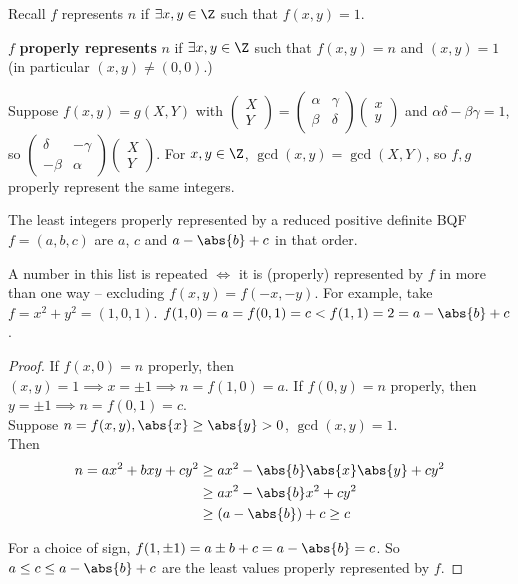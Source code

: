 \documentclass{article}
\begin{document}
Recall $f$ represents $n$ if $\exists x, y \in \Z$ such that $f(x,y) = 1$.
\begin{defi}
    $f$ \textbf{properly represents} $n$ if $\exists x, y \in \Z$ such that $f(x, y) = n$ and $(x, y) = 1$ (in particular $(x, y) \neq (0, 0)$.)
\end{defi}

\begin{remark}
    Suppose $f(x, y) = g(X, Y)$ with $\begin{pmatrix}X \\ Y\end{pmatrix} = \begin{pmatrix}\alpha & \gamma \\ \beta & \delta\end{pmatrix} \begin{pmatrix}x \\ y\end{pmatrix}$ and $\alpha\delta - \beta \gamma = 1$, so $\begin{pmatrix}\delta & -\gamma \\ -\beta &  \alpha \end{pmatrix} \begin{pmatrix}X \\ Y\end{pmatrix}$.
    For $x, y \in \Z$, $\gcd(x, y) = \gcd(X, Y)$, so $f, g$ properly represent the same integers.
\end{remark}

\begin{nlemma}\label{lem:4.7}
    The least integers properly represented by a reduced positive definite BQF $f = (a, b, c)$ are $a$, $c$ and $a - \abs{b} + c$ in that order.
\end{nlemma}
A number in this list is repeated $\iff$ it is (properly) represented by $f$ in more than one way -- excluding $f(x, y) = f(-x, -y)$.
For example, take $f=x^2 + y^2 = (1, 0, 1)$. $f(1, 0) = a = f(0, 1) = c < f(1, 1) = 2 = a - \abs{b} + c$.

\begin{proof}
    If $f(x, 0) = n$ properly, then $(x, y) = 1 \implies x = \pm 1 \implies n = f(1, 0) = a$.
    If $f(0, y) = n$ properly, then $y = \pm 1 \implies n = f(0, 1) = c$. \\
    Suppose $n = f(x, y), \abs{x} \geq \abs{y} > 0$, $\gcd(x, y) = 1$. \\
    Then
    \begin{align*}
        n = a x^2 + b xy + cy^2 &\geq a x^2 - \abs{b} \abs{x} \abs{y} + c y^2 \\
                                &\geq a x^2 -\abs{b} x^2 + c y^2 \\
                                &\geq (a - \abs{b}) + c \geq c
    \end{align*}

    For a choice of sign, $f(1, \pm1) = a \pm b + c = a - \abs{b} = c$. So $a \leq c \leq a - \abs{b} + c$ are the least values properly represented by $f$.
\end{proof}
\end{document}
